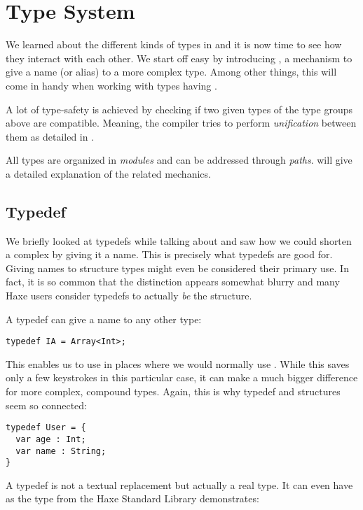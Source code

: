 \chapter{Type System}
\label{type-system}

We learned about the different kinds of types in  and it is now time to see how they interact with each other. We start off easy by introducing , a mechanism to give a name (or alias) to a more complex type. Among other things, this will come in handy when working with types having .

A lot of type-safety is achieved by checking if two given types of the type groups above are compatible. Meaning, the compiler tries to perform \emph{unification} between them as detailed in .

All types are organized in \emph{modules} and can be addressed through \emph{paths}.  will give a detailed explanation of the related mechanics.

\section{Typedef}
\label{type-system-typedef}

We briefly looked at typedefs while talking about  and saw how we could shorten a complex  by giving it a name. This is precisely what typedefs are good for. Giving names to structure types might even be considered their primary use. In fact, it is so common that the distinction appears somewhat blurry and many Haxe users consider typedefs to actually \emph{be} the structure.

A typedef can give a name to any other type:

\begin{lstlisting}
typedef IA = Array<Int>;
\end{lstlisting}
This enables us to use  in places where we would normally use . While this saves only a few keystrokes in this particular case, it can make a much bigger difference for more complex, compound types. Again, this is why typedef and structures seem so connected:

\begin{lstlisting}
typedef User = {
  var age : Int;
  var name : String;
}
\end{lstlisting}
A typedef is not a textual replacement but actually a real type. It can even have  as the  type from the Haxe Standard Library demonstrates:

